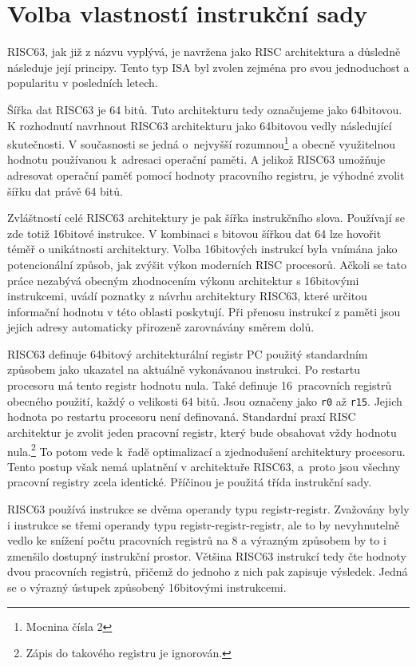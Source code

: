 \documentclass[
  digital, %
  color,   %
  table,   %
  twoside, %
  nolof,   %
  nolot,   %
]{fithesis3}
\begin{document}
\section{Volba vlastností instrukční sady}
RISC63, jak již z názvu vyplývá, je navržena jako RISC architektura a důsledně následuje její principy. Tento typ ISA byl zvolen zejména pro svou jednoduchost a popularitu v posledních letech.

Šířka dat RISC63 je 64 bitů. Tuto architekturu tedy označujeme jako 64bitovou. K rozhodnutí navrhnout RISC63 architekturu jako 64bitovou vedly následující skutečnosti. V současnosti se jedná o~nejvyšší rozumnou\footnote{Mocnina čísla 2} a obecně využitelnou hodnotu používanou k~adresaci operační paměti. A jelikož RISC63 umožňuje adresovat operační paměť pomocí hodnoty pracovního registru, je výhodné zvolit šířku dat právě 64 bitů.

Zvláštností celé RISC63 architektury je pak šířka instrukčního slova. Používají se zde totiž 16bitové instrukce. V kombinaci s bitovou šířkou dat 64 lze hovořit téměř o unikátnosti architektury. Volba 16bitových instrukcí byla vnímána jako potencionální způsob, jak zvýšit výkon moderních RISC procesorů. Ačkoli se tato práce nezabývá obecným zhodnocením výkonu architektur s 16bitovými instrukcemi, uvádí poznatky z návrhu architektury RISC63, které určitou informační hodnotu v této oblasti poskytují. Při přenosu instrukcí z paměti jsou jejich adresy automaticky přirozeně zarovnávány směrem dolů.

RISC63 definuje 64bitový architekturální registr PC použitý standardním způsobem jako ukazatel na aktuálně vykonávanou instrukci. Po restartu procesoru má tento registr hodnotu nula. Také definuje 16~pracovních registrů obecného použití, každý o velikosti 64 bitů. Jsou označeny jako \texttt{r0} až \texttt{r15}. Jejich hodnota po restartu procesoru není definovaná. Standardní praxí RISC architektur je zvolit jeden pracovní registr, který bude obsahovat vždy hodnotu nula.\footnote{Zápis do takového registru je ignorován.} To potom vede k~řadě optimalizací a zjednodušení architektury procesoru. Tento postup však nemá uplatnění v architektuře RISC63, a~proto jsou všechny pracovní registry zcela identické. Příčinou je použitá třída instrukční sady.

RISC63 používá instrukce se dvěma operandy typu registr-registr. Zvažovány byly i instrukce se třemi operandy typu registr-registr-registr, ale to by nevyhnutelně vedlo ke snížení počtu pracovních registrů na 8 a výrazným způsobem by to i zmenšilo dostupný instrukční prostor. Většina RISC63 instrukcí tedy čte hodnoty dvou pracovních registrů, přičemž do jednoho z nich pak zapisuje výsledek. Jedná se o výrazný ústupek způsobený 16bitovými instrukcemi.
\end{document}
